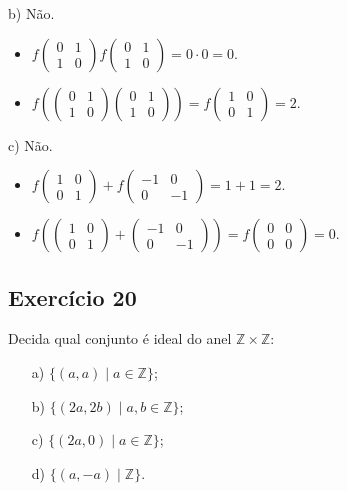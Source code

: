 \documentclass[10pt,a4paper]{article}
\begin{document}
b) Não.
\begin{itemize}
\item $f\begin{pmatrix}
0&1\\1&0
\end{pmatrix}f\begin{pmatrix}
0&1\\1&0
\end{pmatrix}=0\cdot 0=0$.
\item $f\left(\begin{pmatrix}
0&1\\1&0
\end{pmatrix}\begin{pmatrix}
0&1\\1&0
\end{pmatrix}\right)=f\begin{pmatrix}
1&0\\0&1
\end{pmatrix}=2$.
\end{itemize}

c) Não.
\begin{itemize}
\item $f\begin{pmatrix}
1&0\\0&1
\end{pmatrix}+f\begin{pmatrix}
-1&0\\0&-1
\end{pmatrix}=1+1=2$.
\item $f\left(\begin{pmatrix}
1&0\\0&1
\end{pmatrix}+\begin{pmatrix}
-1&0\\0&-1
\end{pmatrix}\right)=f\begin{pmatrix}
0&0\\0&0
\end{pmatrix}=0$.
\end{itemize}

\subsection*{Exercício 20}
Decida qual conjunto é ideal do anel $\mathbb{Z}\times\mathbb{Z}$:
\begin{itemize}
\item[a)] $\{(a,a)\mid a\in\mathbb{Z}\}$;
\item[b)] $\{(2a,2b)\mid a,b\in\mathbb{Z}\}$;
\item[c)] $\{(2a,0)\mid a\in\mathbb{Z}\}$;
\item[d)] $\{(a,-a)\mid\mathbb{Z}\}$.
\end{itemize}
\end{document}
